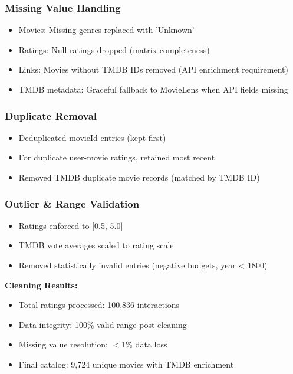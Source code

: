 \documentclass[11pt,a4paper]{article}
\begin{document}
\subsubsection{Missing Value Handling}
\begin{itemize}
    \item Movies: Missing genres replaced with 'Unknown'
    \item Ratings: Null ratings dropped (matrix completeness)
    \item Links: Movies without TMDB IDs removed (API enrichment requirement)
    \item TMDB metadata: Graceful fallback to MovieLens when API fields missing
\end{itemize}

\subsubsection{Duplicate Removal}
\begin{itemize}
    \item Deduplicated movieId entries (kept first)
    \item For duplicate user-movie ratings, retained most recent
    \item Removed TMDB duplicate movie records (matched by TMDB ID)
\end{itemize}

\subsubsection{Outlier \& Range Validation}
\begin{itemize}
    \item Ratings enforced to [0.5, 5.0]
    \item TMDB vote averages scaled to rating scale
    \item Removed statistically invalid entries (negative budgets, year < 1800)
\end{itemize}

\textbf{Cleaning Results:}

\begin{itemize}
    \item Total ratings processed: 100,836 interactions
    \item Data integrity: 100\% valid range post-cleaning
    \item Missing value resolution: $<$1\% data loss
    \item Final catalog: 9,724 unique movies with TMDB enrichment
\end{itemize}
\end{document}

